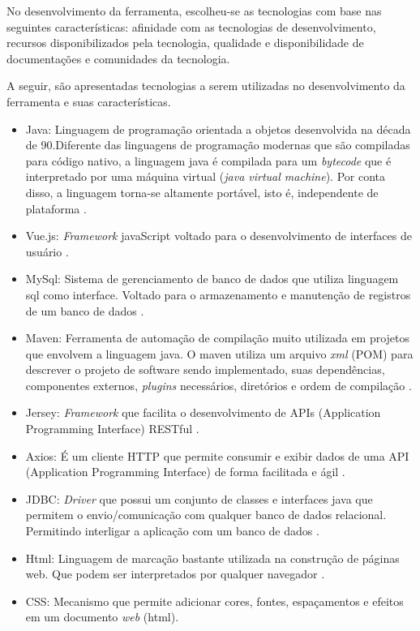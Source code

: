 No desenvolvimento da ferramenta, escolheu-se as tecnologias com base nas seguintes características: afinidade
com as tecnologias de desenvolvimento, recursos disponibilizados pela tecnologia, qualidade e disponibilidade
de documentações e comunidades da tecnologia.

A seguir, são apresentadas tecnologias a serem utilizadas no desenvolvimento da ferramenta e suas características.

\begin{itemize}
	\item Java: Linguagem de programação orientada a objetos desenvolvida na década de 90.Diferente das linguagens de programação
		modernas que são compiladas para código nativo, a linguagem java é compilada para um \textit{bytecode} que é interpretado por uma máquina
		virtual (\textit{java virtual machine}). Por conta disso, a linguagem torna-se altamente portável, isto é, independente de plataforma \cite{java}.
	\item Vue.js: \textit{Framework} javaScript voltado para o desenvolvimento de interfaces de usuário \cite{vue}.
	\item MySql: Sistema de gerenciamento de banco de dados que utiliza linguagem sql como interface. Voltado para o armazenamento e manutenção 
		de registros de um banco de dados \cite{mysql}.
	\item Maven: Ferramenta de automação de compilação muito utilizada em projetos que envolvem a linguagem java. O maven
		utiliza um arquivo \textit{xml} (POM) para descrever o projeto de software sendo implementado, suas dependências, componentes
		externos, \textit{plugins} necessários, diretórios e ordem de compilação \cite{maven}.
	\item Jersey: \textit{Framework} que facilita o desenvolvimento de APIs (Application Programming Interface) RESTful \cite{jersey}.
	\item Axios: É um cliente HTTP que permite consumir e exibir dados de uma API (Application Programming Interface) de forma facilitada e ágil \cite{axios}.
	\item JDBC: \textit{Driver} que possui um conjunto de classes e interfaces java que permitem o envio/comunicação com qualquer
		banco de dados relacional. Permitindo interligar a aplicação com um banco de dados \cite{jdbc}.
	\item Html: Linguagem de marcação bastante utilizada na construção de páginas web. Que podem ser interpretados por 
		qualquer navegador \cite{html}.
	\item CSS: Mecanismo que permite adicionar cores, fontes, espaçamentos e efeitos em um documento \textit{web} (html). \cite{css}

\end{itemize}
